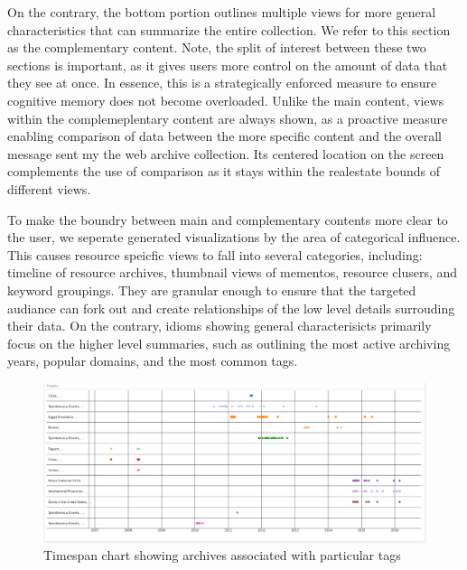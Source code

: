 \documentclass[10pt,journal,compsoc]{IEEEtran}
\begin{document}
On the contrary, the bottom portion outlines multiple views for more general characteristics that can summarize the entire collection. We refer to this section as the complementary content. Note, the split of interest between these two sections is important, as it gives users more control on the amount of data that they see at once. In essence, this is a strategically enforced measure to ensure cognitive memory does not become overloaded. Unlike the main content, views within the complemeplentary content are always shown, as a proactive measure enabling comparison of data between the more specific content and the overall message sent my the web archive collection. Its centered location on the screen complements the use of comparison as it stays within the realestate bounds of different views. \par

To make the boundry between main and complementary contents more clear to the user, we seperate generated visualizations by the area of categorical influence. This causes resource speicfic views to fall into several categories, including: timeline of resource archives, thumbnail views of mementos, resource clusers, and keyword groupings. They are granular enough to ensure that the targeted audiance can fork out and create relationships of the low level details surrouding their data. On the contrary, idioms showing general characterisicts primarily focus on the higher level summaries, such as outlining the most active archiving years, popular domains, and the most common tags. \par 

\begin{figure}
\centering
\includegraphics[width=\textwidth]{Figure4}
\caption{Timespan chart showing archives associated with particular tags}
\label{fig:mesh3}
\end{figure}
\end{document}
